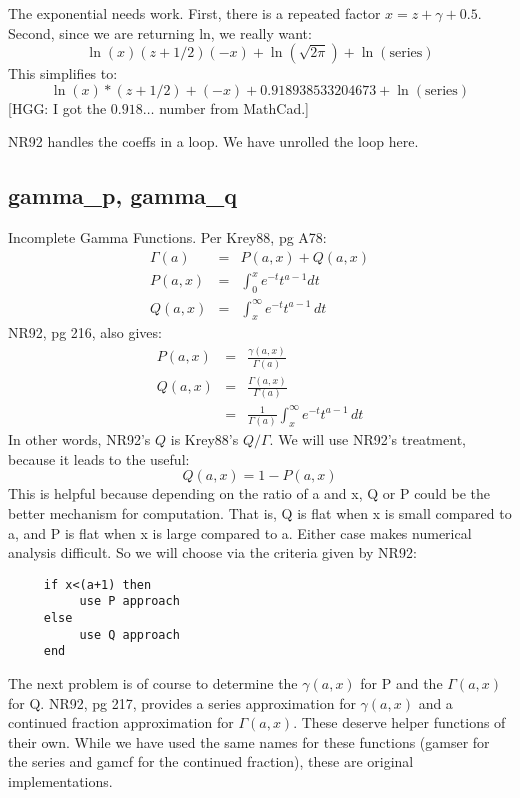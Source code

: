 The exponential needs work.  First, there
is a repeated factor $x=z+\gamma+0.5$.  Second, since we are
returning ln, we really want:
\begin{equation}
  \ln(x)(z+1/2)(-x)+\ln(\sqrt{2\pi})+\ln(\mbox{series})
\end{equation}
This simplifies to:
\begin{equation}
  \ln(x)*(z+1/2)+(-x)+0.918938533204673+\ln(\mbox{series})
\end{equation}
[HGG: I got the $0.918\ldots $ number from MathCad.]

NR92 handles the coeffs in a loop.  We have unrolled the loop here.

\subsection*{gamma\_p, gamma\_q}
Incomplete Gamma Functions.  Per Krey88, pg A78:
\begin{eqnarray}
 \Gamma(a) & =& P(a,x) + Q(a,x)\\
 P(a,x) & = & \int_0^x e^{-t}t^{a-1}dt\\
 Q(a,x) & = & \int_x^\infty e^{-t}t^{a-1}\,dt
\end{eqnarray}
NR92, pg 216, also gives:
\begin{eqnarray}
  P(a,x) & = & \frac{\gamma (a,x)}{\Gamma (a)}\\
  Q(a,x) & = & \frac{\Gamma (a,x)}{\Gamma (a)}\\
         & = & \frac{1}{\Gamma(a)} \int_x^\infty e^{-t}t^{a-1}\,dt
\end{eqnarray}
In other words, NR92's $Q$ is Krey88's $Q/\Gamma$.  We will use 
NR92's treatment, because it leads to the useful:
\begin{equation}
  Q(a,x) = 1 - P(a,x)
\end{equation}
This is helpful because depending on the ratio of a and x, Q or P could
be the better mechanism for computation.  That is, Q is flat when 
x is small compared to a, and P is flat when x is large compared to a.
Either case makes numerical analysis difficult.  So we will choose
via the criteria given by NR92:
\begin{verbatim}
     if x<(a+1) then
          use P approach
     else
          use Q approach
     end
\end{verbatim}

The next problem is of course to determine the $\gamma(a,x)$ for P and
the $\Gamma(a,x)$ for Q.  NR92, pg 217, provides a series approximation
for $\gamma(a,x)$ and a continued fraction approximation
for $\Gamma(a,x)$. These deserve helper functions of their own.
While we have used the same
names for these functions (gamser for the series and gamcf for the
continued fraction), these are original implementations.


